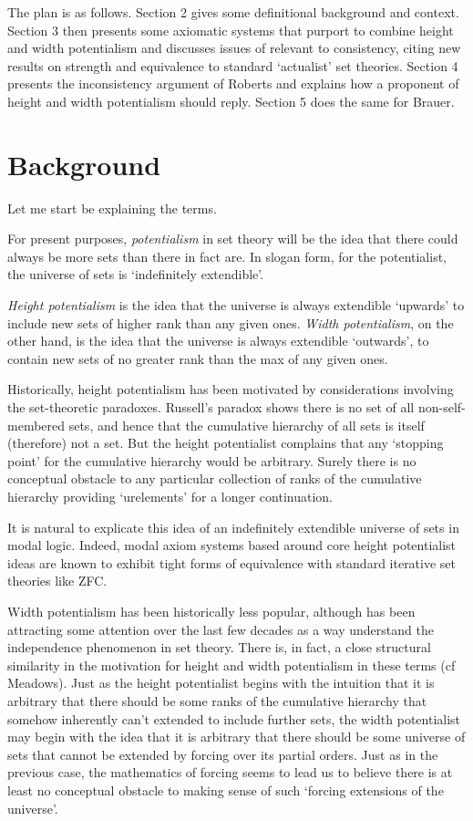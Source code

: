 \documentclass{article}
\begin{document}
The plan is as follows. 
Section 2 gives some definitional background and context. 
Section 3 then presents some axiomatic systems that purport to 
combine height  and width  potentialism and discusses
issues of relevant to consistency, citing new results
on strength and equivalence to standard `actualist' 
set theories. Section 4 presents the 
inconsistency argument of Roberts and explains 
how a proponent of height and width potentialism should reply.
Section 5 does the same for Brauer.

\section{Background}
Let me start be explaining the terms. 

For present purposes, \emph{potentialism} in set theory 
will be the idea that there could always be 
more sets than there in fact are. 
In slogan form, for the potentialist,  
the universe of sets is `indefinitely extendible'. 

\emph{Height potentialism} is the idea that the universe
is always extendible `upwards' to include 
new sets of higher rank than any given ones. 
\emph{Width potentialism}, on the other hand, 
is the idea that the universe is always extendible 
`outwards', to contain new sets of no greater rank 
than the max of any given ones.

Historically, height potentialism has been motivated 
by considerations involving the set-theoretic paradoxes. 
Russell's paradox shows there is no set of all 
non-self-membered sets, and hence that the cumulative 
hierarchy of all sets is itself (therefore) not a set. 
But the height potentialist complains that any 
`stopping point' for the cumulative hierarchy 
would be arbitrary. Surely there is no conceptual obstacle 
to any particular collection of ranks of the cumulative 
hierarchy providing `urelements' for a longer continuation.

It is natural to
explicate this idea of an indefinitely extendible 
universe of sets in modal logic. 
Indeed, modal axiom systems based around core height potentialist 
ideas are known to exhibit tight forms of 
equivalence with standard iterative set theories like ZFC.

Width potentialism has been historically 
less popular, although has been attracting 
some attention over the last few decades as a 
way understand the independence phenomenon in set 
theory. There is, in fact, a close structural 
similarity in the motivation for height  and 
width  potentialism in these terms (cf Meadows). 
Just as the height potentialist begins with the 
intuition that it is arbitrary that there should be 
some ranks of the cumulative hierarchy that somehow 
inherently can't extended to include further sets, 
the width  potentialist may begin with the idea that 
it is arbitrary that there should be some universe of 
sets that cannot be extended by forcing over its 
partial orders. Just as in the previous case, the 
mathematics of forcing seems to lead us to believe 
there is at least no conceptual obstacle to making 
sense of such `forcing extensions of the universe'.
\end{document}

